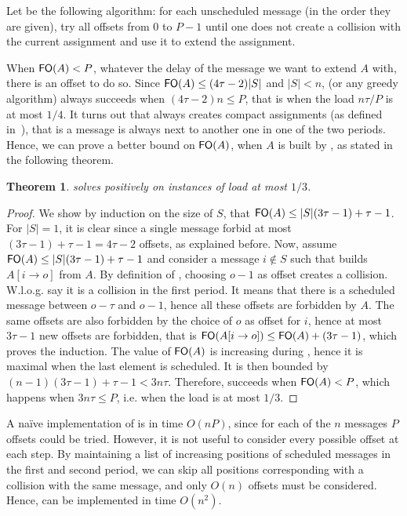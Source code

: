 \documentclass[pdflatex,sn-mathphys,iicol]{sn-jnl}%
\theoremstyle{thmstyleone}%
\newtheorem{theorem}{Theorem}%
\theoremstyle{thmstyletwo}%
\theoremstyle{thmstylethree}%
\begin{document}
Let \firstfit be the following algorithm:  for each unscheduled message (in the order they are given), try all offsets from $0$ to $P-1$ until one does not create a collision with the current assignment and use it to extend the assignment. 

When $\textsf{FO}(A) < P$, whatever the delay of the message we want to extend $A$ with, there is an offset to do so. Since $\textsf{FO}(A) \leq (4 \tau -2)\lvert S\rvert$ and $\lvert S\rvert < n$, \firstfit (or any greedy algorithm) always succeeds when $(4 \tau -2)n \leq P$, that is when the load $ n\tau /P$ is at most $1/4$.
It turns out that \firstfit always creates compact assignments (as defined in~\cite{bartharxiv2018deterministic}), that is a message is always next to another one in one of the two periods. Hence, we can prove a better bound on $\textsf{FO}(A)$, when $A$ is built by \firstfit, as stated in the following theorem.

\begin{theorem}
\firstfit solves \pma positively on instances of load at most $1/3$. 
\end{theorem}
\begin{proof}
We show by induction on the size of $S$, that $\textsf{FO}(A) \leq \lvert S\rvert(3\tau -1) + \tau - 1$. For $\lvert S\rvert = 1$, it is clear since a single message forbid at most $(3\tau -1) + \tau -1 = 4\tau-2$ offsets, as explained before. Now, assume $\textsf{FO}(A) \leq \lvert S\rvert(3\tau -1) + \tau -1$ and consider a message $i \notin S$ such that \firstfit builds $A[i \rightarrow o]$ from $A$. By definition of \firstfit, choosing $o-1$ as offset creates a collision. W.l.o.g. say it is a collision in the first period. It means that there is a scheduled message between $o - \tau $ and $o-1$, hence all these offsets are forbidden by $A$. The same offsets are also forbidden by the choice of $o$ as offset for $i$, hence at most $3\tau -1$ new offsets are forbidden, that is $\textsf{FO}(A[i \rightarrow o]) \leq \textsf{FO}(A) + (3\tau -1)$, which proves the induction. 
The value of $\textsf{FO}(A)$ is increasing during \firstfit, hence it is maximal when the last element is scheduled. It is then bounded by $(n-1)(3\tau -1) + \tau - 1 < 3n\tau$.
Therefore, \firstfit succeeds when $\textsf{FO}(A) < P$, which happens when $3n\tau \leq P$, i.e. when the load is at most $1/3$.
\end{proof}


A naïve implementation of \firstfit is in time $O(nP)$, since for each of the $n$ messages $P$ offsets could be tried. However, it is not useful to consider every possible offset at each step. By maintaining a list of increasing positions of scheduled messages in the first and second period, 
we can skip all positions corresponding with a collision with the same message, and only $O(n)$ offsets must be considered. Hence, \firstfit can be implemented in time $O(n^2)$.
\end{document}
